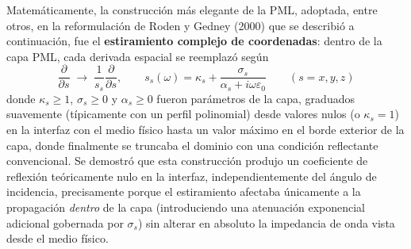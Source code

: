 Matemáticamente, la construcción más elegante de la PML, adoptada, entre otros, en la reformulación de Roden y Gedney (2000) que se describió a continuación, fue el \textbf{estiramiento complejo de coordenadas}: dentro de la capa PML, cada derivada espacial se reemplazó según
\begin{equation}
    \frac{\partial}{\partial s} \;\longrightarrow\; \frac{1}{s_s}\frac{\partial}{\partial s}, \qquad s_s(\omega) = \kappa_s + \frac{\sigma_s}{\alpha_s+i\omega\varepsilon_0} \qquad (s=x, y, z)
\end{equation}
donde $\kappa_s\geq1$, $\sigma_s\geq0$ y $\alpha_s\geq0$ fueron parámetros de la capa, graduados suavemente (típicamente con un perfil polinomial) desde valores nulos (o $\kappa_s=1$) en la interfaz con el medio físico hasta un valor máximo en el borde exterior de la capa, donde finalmente se truncaba el dominio con una condición reflectante convencional. Se demostró que esta construcción produjo un coeficiente de reflexión teóricamente nulo en la interfaz, independientemente del ángulo de incidencia, precisamente porque el estiramiento afectaba únicamente a la propagación \textit{dentro} de la capa (introduciendo una atenuación exponencial adicional gobernada por $\sigma_s$) sin alterar en absoluto la impedancia de onda vista desde el medio físico.

